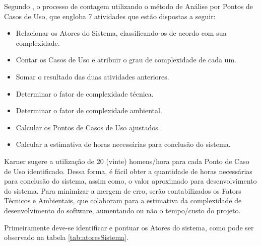 			Segundo \cite{pontosUC}, o processo de contagem utilizando o método de Análise por Pontos de Casos de Uso, que engloba 7 atividades que estão dispostas a seguir:

		\begin{itemize}
			\item Relacionar os Atores do Sistema, classificando-os de acordo com sua complexidade.
			\item Contar os Casos de Uso e atribuir o grau de complexidade de cada um.
			\item Somar o resultado das duas atividades anteriores.
			\item Determinar o fator de complexidade técnica.
			\item Determinar o fator de complexidade ambiental.
			\item Calcular os Pontos de Casos de Uso ajustados.
			\item Calcular a estimativa de horas necessárias para conclusão do sistema.
		\end{itemize}

		Karner \cite{karner1993resource} sugere a utilização de 20 (vinte) homens/hora para cada Ponto de Caso de Uso identificado. Dessa forma, é fácil obter a quantidade de horas necessárias para conclusão do sistema, assim como, o valor aproximado para desenvolvimento do sistema. Para minimizar a mergem de erro, serão contabilizados os Fators Técnicos e Ambientais, que colaboram para a estimativa da complexidade de desenvolvimento do software, aumentando ou não o tempo/custo do projeto.

		Primeiramente deve-se identificar e pontuar os Atores do sistema, como pode ser observado na tabela \ref{tab:atoresSistema}.

